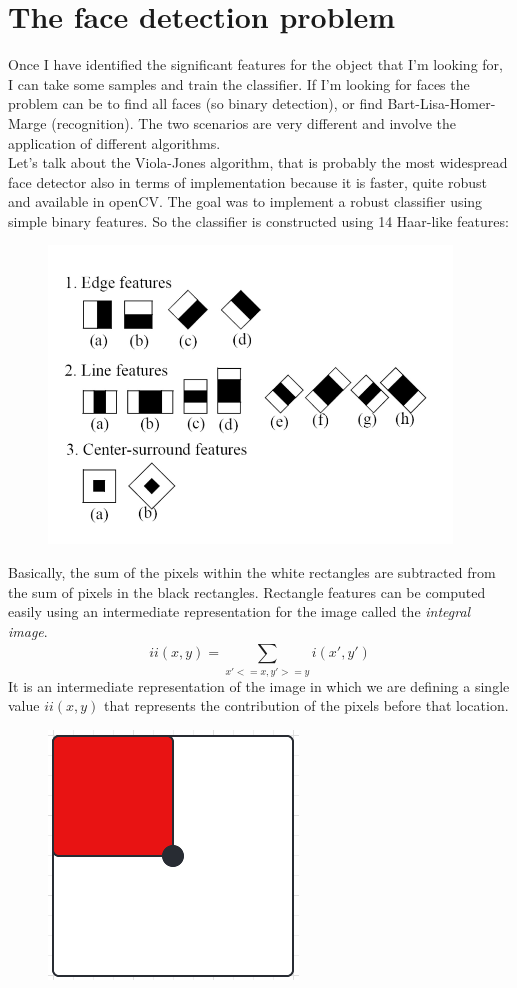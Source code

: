 \section{The face detection problem}
Once I have identified the significant features for the object that I'm looking for, I can take some samples and train the classifier.
If I’m looking for faces the problem can be to find all faces (so binary detection), or find Bart-Lisa-Homer-Marge (recognition).
The two scenarios are very different and involve the application of different algorithms.
\\Let's talk about the Viola-Jones algorithm, that is probably the most widespread face detector also in terms of implementation because it is faster, quite robust and available in openCV.
The goal was to implement a robust classifier using simple binary features.
So the classifier is constructed using 14 Haar-like features:
\begin{figure}[h]
    \centering
    \includegraphics[scale=0.7]{Figures/ViolaJones.png}
\end{figure}
Basically, the sum of the pixels within the white rectangles are subtracted from the sum of pixels in the black rectangles.
Rectangle features can be computed easily using an intermediate representation for the image called the \textit{integral image}.
\[ii(x,y)=\sum_{x'<=x, y'>=y}^{}i(x', y')\]
It is an intermediate representation of the image in which we are defining a single value $ii(x,y)$ that represents the contribution of the pixels before that location.
\begin{figure}
    \includegraphics[width=0.5\linewidth]{Figures/IntegralImage.png}
\end{figure}
